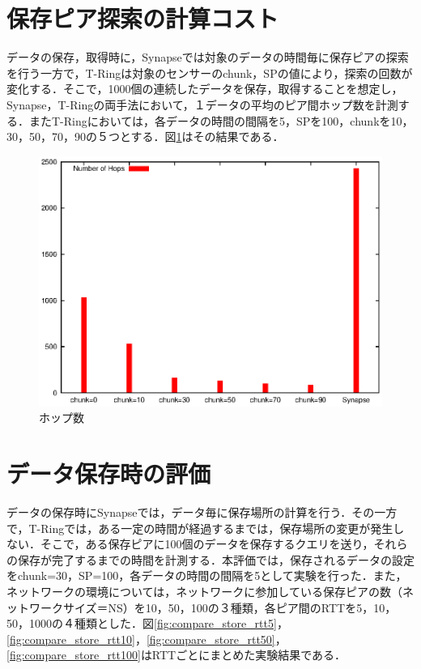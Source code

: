 \section{保存ピア探索の計算コスト}
データの保存，取得時に，Synapseでは対象のデータの時間毎に保存ピアの探索を行う一方で，T-Ringは対象のセンサーのchunk，SPの値により，探索の回数が変化する．そこで，1000個の連続したデータを保存，取得することを想定し，Synapse，T-Ringの両手法において，１データの平均のピア間ホップ数を計測する．またT-Ringにおいては，各データの時間の間隔を5，SPを100，chunkを10，30，50，70，90の５つとする．図\ref{fig:compare_hop}はその結果である．

 \begin{figure}[htbp]
  \begin{center}
   \includegraphics[width=130mm]{./images/compare_hop.eps}
  \end{center}
  \caption{ホップ数}
  \label{fig:compare_hop}
\end{figure}



\section{データ保存時の評価}
データの保存時にSynapseでは，データ毎に保存場所の計算を行う．その一方で，T-Ringでは，ある一定の時間が経過するまでは，保存場所の変更が発生しない．そこで，ある保存ピアに100個のデータを保存するクエリを送り，それらの保存が完了するまでの時間を計測する．本評価では，保存されるデータの設定をchunk=30，SP=100，各データの時間の間隔を5として実験を行った．また，ネットワークの環境については，ネットワークに参加している保存ピアの数（ネットワークサイズ＝NS）を10，50，100の３種類，各ピア間のRTTを5，10，50，1000の４種類とした．図\ref{fig:compare_store_rtt5}，\ref{fig:compare_store_rtt10}，\ref{fig:compare_store_rtt50}，\ref{fig:compare_store_rtt100}はRTTごとにまとめた実験結果である．

